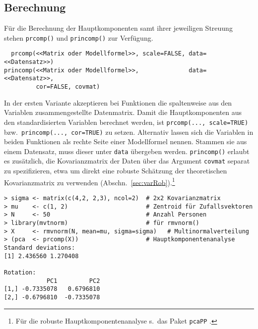 \subsection{Berechnung}
\label{sec:pcaCalc}

Für die Berechnung der Hauptkomponenten samt ihrer jeweiligen Streuung stehen \lstinline!prcomp()! und \lstinline!princomp()! zur Verfügung.
\begin{lstlisting}
  prcomp(<<Matrix oder Modellformel>>, scale=FALSE, data=<<Datensatz>>)
princomp(<<Matrix oder Modellformel>>,              data=<<Datensatz>>,
         cor=FALSE, covmat)
\end{lstlisting}

In der ersten Variante akzeptieren bei Funktionen die spaltenweise aus den Variablen zusammengestellte Datenmatrix. Damit die Hauptkomponenten aus den standardisierten Variablen berechnet werden, ist \lstinline!prcomp(..., scale=TRUE)! bzw.\ \lstinline!princomp(..., cor=TRUE)! zu setzen. Alternativ lassen sich die Variablen in beiden Funktionen als rechte Seite einer Modellformel nennen. Stammen sie aus einem Datensatz, muss dieser unter \lstinline!data! übergeben werden. \lstinline!princomp()! erlaubt es zusätzlich, die Kovarianzmatrix der Daten über das Argument \lstinline!covmat! separat zu spezifizieren, etwa um direkt eine  robuste Schätzung der theoretischen Kovarianzmatrix zu verwenden (Abschn.\ \ref{sec:varRob}).\footnote{Für die robuste Hauptkomponentenanalyse s.\ das Paket \lstinline!pcaPP! \cite{Filzmoser2011a}.}
\begin{lstlisting}
> sigma <- matrix(c(4,2, 2,3), ncol=2)  # 2x2 Kovarianzmatrix
> mu    <- c(1, 2)                      # Zentroid für Zufallsvektoren
> N     <- 50                           # Anzahl Personen
> library(mvtnorm)                      # für rmvnorm()
> X     <- rmvnorm(N, mean=mu, sigma=sigma)   # Multinormalverteilung
> (pca  <- prcomp(X))                   # Hauptkomponentenanalyse
Standard deviations:
[1] 2.436560 1.270408

Rotation:
            PC1         PC2
[1,] -0.7335078   0.6796810
[2,] -0.6796810  -0.7335078
\end{lstlisting}

